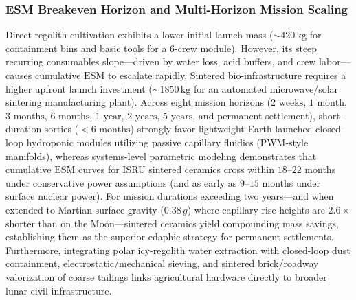 \subsubsection{ESM Breakeven Horizon and Multi-Horizon Mission Scaling}
Direct regolith cultivation exhibits a lower initial launch mass ($\sim 420\,\mathrm{kg}$ for containment bins and basic tools for a 6-crew module)\cite{paul2022plants,ming1989lunar}. However, its steep recurring consumables slope---driven by water loss, acid buffers, and crew labor---causes cumulative $\mathrm{ESM}$ to escalate rapidly\cite{ming1989lunar,hanford2004advanced,fackrell2024mechanical}. Sintered bio-infrastructure requires a higher upfront launch investment ($\sim 1850\,\mathrm{kg}$ for an automated microwave/solar sintering manufacturing plant)\cite{ming1989lunar,meek1993mechanical}. Across eight mission horizons ($2\text{ weeks}$, $1\text{ month}$, $3\text{ months}$, $6\text{ months}$, $1\text{ year}$, $2\text{ years}$, $5\text{ years}$, and permanent settlement), short-duration sorties ($<6\text{ months}$) strongly favor lightweight Earth-launched closed-loop hydroponic modules utilizing passive capillary fluidics (PWM-style manifolds)\cite{weislogel2026pwm,hatch2022pwm}, whereas systems-level parametric modeling demonstrates that cumulative $\mathrm{ESM}$ curves for ISRU sintered ceramics cross within $18\text{--}22$ months under conservative power assumptions (and as early as $9\text{--}15$ months under surface nuclear power)\cite{ming1989lunar,chinnannan2025spirulina,metzger2023cost}. For mission durations exceeding two years—and when extended to Martian surface gravity ($0.38\,g$) where capillary rise heights are $2.6\times$ shorter than on the Moon—sintered ceramics yield compounding mass savings, establishing them as the superior edaphic strategy for permanent settlements. Furthermore, integrating polar icy-regolith water extraction with closed-loop dust containment, electrostatic/mechanical sieving, and sintered brick/roadway valorization of coarse tailings links agricultural hardware directly to broader lunar civil infrastructure.

